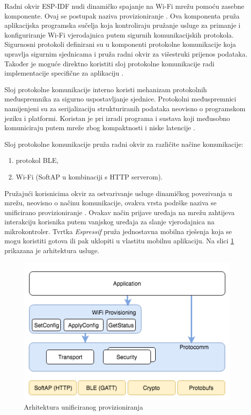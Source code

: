 Radni okvir ESP-IDF nudi dinamičko spajanje na Wi-Fi mrežu pomoću zasebne komponente. Ovaj se postupak naziva provizioniranje . Ova komponenta pruža aplikacijska programska sučelja  koja kontroliraju pružanje usluge za primanje i konfiguriranje Wi-Fi vjerodajnica putem sigurnih komunikacijskih protokola. Sigurnosni protokoli definirani su u komponenti protokolne komunikacije  koja upravlja sigurnim sjednicama  i pruža radni okvir za višestruki prijenos podataka. Također je moguće direktno koristiti sloj protokolne komunikacije radi implementacije specifične za aplikaciju \cite{unified_provisioning}.

Sloj protokolne komunikacije interno koristi mehanizam protokolnih međuspremnika  za sigurno uspostavljanje sjednice. Protokolni međuspremnici namijenjeni su za serijalizaciju strukturiranih podataka neovisno o programskom jeziku i platformi. Koristan je pri izradi programa i sustava koji međusobno komuniciraju putem mreže zbog kompaktnosti i niske latencije \cite{what_is_protobuf}.

Sloj protokolne komunikacije pruža radni okvir za različite načine komunikacije:
\begin{enumerate}
	\item protokol BLE,
	\item Wi-Fi (SoftAP u kombinaciji s HTTP serverom).
\end{enumerate}

Pružajući korisnicima okvir za ostvarivanje usluge dinamičkog povezivanja u mrežu, neovisno o načinu komunikacije, ovakva vrsta podrške naziva se unificirano provizioniranje . Ovakav način prijave uređaja na mrežu zahtijeva interakciju korisnika putem vanjskog uređaja za slanje vjerodajnica na mikrokontroler. Tvrtka \textit{Espressif} pruža jednostavna mobilna rješenja koja se mogu koristiti gotova ili pak uklopiti u vlastitu mobilnu aplikaciju. Na slici \ref{fig:unified_provisioning} prikazana je arhitektura usluge.

\begin{figure}[ht]
	\centering
	\includegraphics[scale=0.8]{imgs/unified_provisioning}
	\caption{Arhitektura unificiranog provizioniranja \cite{unified_provisioning}}
	\label{fig:unified_provisioning}
\end{figure}

